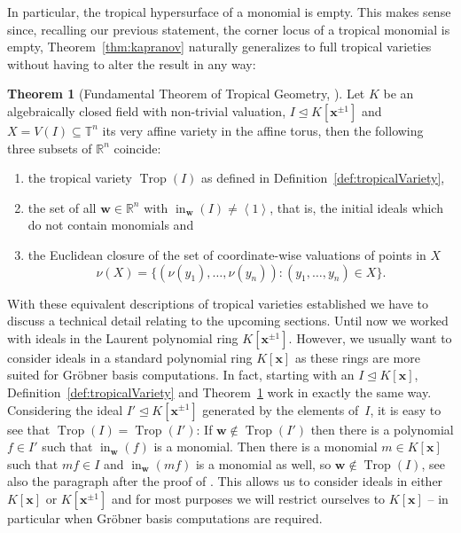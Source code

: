 \documentclass[
  paper=a4,
  titlepage,
  bibliography=totoc,
  pagesize=pdftex
]{scrartcl}
\numberwithin{figure}{section}
\numberwithin{equation}{section}
\numberwithin{table}{section}
\newcommand*\setR{\mathds{R}}
\newcommand*\setT{\mathds{T}}
\newcommand*\ideal[1]{\left\langle #1 \right\rangle}
\let\vec\mathbf
\let\idealof\trianglelefteq
\DeclareMathOperator{\Trop}{Trop}
\DeclareMathOperator{\initial}{in}
\theoremstyle{definition}
\newtheorem{theorem}[definition]{Theorem}
\numberwithin{definition}{section}
\begin{document}
In particular, the tropical hypersurface of a monomial is empty. This makes sense since,
recalling our previous statement, the corner locus of a tropical monomial is empty,
Theorem~\ref{thm:kapranov} naturally generalizes to full tropical varieties without having
to alter the result in any way:

\begin{theorem}[Fundamental Theorem of Tropical Geometry,
  {\cite[Theorem~3.2.5]{sturmMacTrop}}] \label{thm:fundamentalThm}
  Let $K$ be an algebraically closed field with non-trivial valuation, $I \idealof K[\vec
  x^{\pm1}]$ and $X = V(I) \subseteq \setT^n$ its very affine variety in the affine torus,
  then the following three subsets of $\setR^n$ coincide:
  \begin{enumerate}
    \item the tropical variety $\Trop(I)$ as defined in
      Definition~\ref{def:tropicalVariety},
    \item the set of all $\vec w \in \setR^n$ with $\initial_{\vec w}(I) \neq \ideal1$,
      that is, the initial ideals which do not contain monomials and
    \item \label{thm:fund:val}
      the Euclidean closure of the set of coordinate-wise valuations of points in $X$
      \[
        \nu(X) = \{ (\nu(y_1), \dots, \nu(y_n)) : (y_1, \dots, y_n) \in X \}.
      \]
  \end{enumerate}
\end{theorem}

With these equivalent descriptions of tropical varieties established we have to discuss a
technical detail relating to the upcoming sections. Until now we worked with ideals in the
Laurent polynomial ring $K[\vec x^{\pm1}]$. However, we usually want to consider ideals in
a standard polynomial ring $K[\vec x]$ as these rings are more suited for Gröbner basis
computations. In fact, starting with an $I \idealof K[\vec x]$,
Definition~\ref{def:tropicalVariety} and Theorem~\ref{thm:fundamentalThm} work in exactly
the same way. Considering the ideal $I' \idealof K[\vec x^{\pm1}]$ generated by the
elements of~$I$, it is easy to see that $\Trop(I) = \Trop(I')$: If $\vec w \not\in
\Trop(I')$ then there is a polynomial $f \in I'$ such that $\initial_{\vec w}(f)$ is a
monomial. Then there is a monomial $m \in K[\vec x]$ such that $mf \in I$ and
$\initial_{\vec w}(mf)$ is a monomial as well, so $\vec w \not\in \Trop(I)$, see also the
paragraph after the proof of \cite[Corollary~3.3]{compTropVar}. This allows us to consider
ideals in either $K[\vec x]$ or $K[\vec x^{\pm1}]$ and for most purposes we will restrict
ourselves to $K[\vec x]$ -- in particular when Gröbner basis computations are required.
\end{document}
